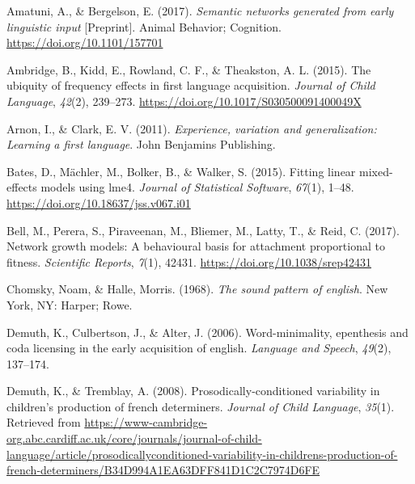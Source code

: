 \documentclass[
  man,mask,floatsintext]{apa6}
\newlength{\cslhangindent}
\newlength{\cslentryspacingunit} %
\newenvironment{CSLReferences}[2] %
 {%
  \setlength{\parindent}{0pt}
  \ifodd #1
  \let\oldpar\par
  \def\par{\hangindent=\cslhangindent\oldpar}
  \fi
  \setlength{\parskip}{#2\cslentryspacingunit}
 }%
 {}
\begin{document}
\hypertarget{refs}{}
\begin{CSLReferences}{1}{0}
\leavevmode{}%
Amatuni, A., \& Bergelson, E. (2017). \emph{Semantic networks generated from early linguistic input} {[}Preprint{]}. Animal Behavior; Cognition. \url{https://doi.org/10.1101/157701}

\leavevmode{}%
Ambridge, B., Kidd, E., Rowland, C. F., \& Theakston, A. L. (2015). The ubiquity of frequency effects in first language acquisition. \emph{Journal of Child Language}, \emph{42}(2), 239--273. \url{https://doi.org/10.1017/S030500091400049X}

\leavevmode{}%
Arnon, I., \& Clark, E. V. (2011). \emph{Experience, variation and generalization: Learning a first language}. John Benjamins Publishing.

\leavevmode{}%
Bates, D., Mächler, M., Bolker, B., \& Walker, S. (2015). Fitting linear mixed-effects models using {lme4}. \emph{Journal of Statistical Software}, \emph{67}(1), 1--48. \url{https://doi.org/10.18637/jss.v067.i01}

\leavevmode{}%
Bell, M., Perera, S., Piraveenan, M., Bliemer, M., Latty, T., \& Reid, C. (2017). Network growth models: A behavioural basis for attachment proportional to fitness. \emph{Scientific Reports}, \emph{7}(1), 42431. \url{https://doi.org/10.1038/srep42431}

\leavevmode{}%
Chomsky, Noam, \& Halle, Morris. (1968). \emph{The sound pattern of english}. New York, {NY}: Harper; Rowe.

\leavevmode{}%
Demuth, K., Culbertson, J., \& Alter, J. (2006). Word-minimality, epenthesis and coda licensing in the early acquisition of english. \emph{Language and Speech}, \emph{49}(2), 137--174.

\leavevmode{}%
Demuth, K., \& Tremblay, A. (2008). Prosodically-conditioned variability in children's production of french determiners. \emph{Journal of Child Language}, \emph{35}(1). Retrieved from \url{https://www-cambridge-org.abc.cardiff.ac.uk/core/journals/journal-of-child-language/article/prosodicallyconditioned-variability-in-childrens-production-of-french-determiners/B34D994A1EA63DFF841D1C2C7974D6FE}


\end{CSLReferences}
\end{document}
